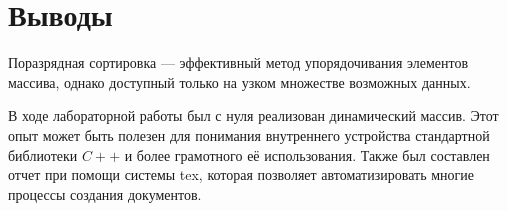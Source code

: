 \section{Выводы}
Поразрядная сортировка --- эффективный метод упорядочивания элементов массива, однако доступный только на узком множестве возможных данных.

В ходе лабораторной работы был с нуля реализован динамический массив. Этот опыт может быть полезен для понимания внутреннего устройства стандартной библиотеки $C++$ и более грамотного её использования.
Также был составлен отчет при помощи системы tex, которая позволяет автоматизировать многие процессы создания документов.
\pagebreak
